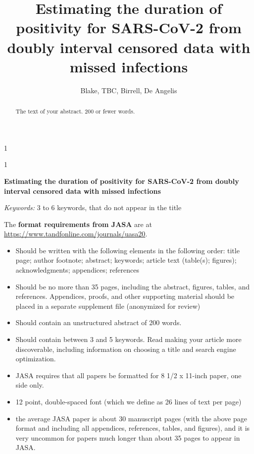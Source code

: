 \documentclass[12pt]{article}
\newcommand{\blind}{1}
\newcommand{\fulltitle}{Estimating the duration of positivity for SARS-CoV-2 from doubly interval censored data with missed infections}
\begin{document}
%

\def\spacingset#1{\renewcommand{\baselinestretch}%
{#1}\small\normalsize} \spacingset{1}



\blind
{
  \title{\bf \fulltitle}
  \author{%
    Blake, TBC, Birrell, De Angelis  
  }
  \maketitle
} \fi

\blind
{
  \bigskip
  \bigskip
  \bigskip
  \begin{center}
    {\LARGE\bf \fulltitle}
\end{center}
  \medskip
} \fi

\bigskip
\begin{abstract}
The text of your abstract. 200 or fewer words.
\end{abstract}

\noindent%
{\it Keywords:}  3 to 6 keywords, that do not appear in the title
\vfill

\newpage


The \textbf{format requirements from JASA} are at \url{https://www.tandfonline.com/journals/uasa20}.
\begin{itemize}
    \item Should be written with the following elements in the following order: title page; author footnote; abstract; keywords; article text (table(s); figures); acknowledgments; appendices; references
    \item Should be no more than 35 pages, including the abstract, figures, tables, and references. Appendices, proofs, and other supporting material should be placed in a separate supplement file (anonymized for review)
    \item Should contain an unstructured abstract of 200 words.
    \item Should contain between 3 and 5 keywords. Read making your article more discoverable, including information on choosing a title and search engine optimization.
    \item JASA requires that all papers be formatted for 8 1/2 x 11-inch paper, one side only.
    \item 12 point, double-spaced font (which we define as 26 lines of text per page)
    \item the average JASA paper is about 30 manuscript pages (with the above page format and including all appendices, references, tables, and figures), and it is very uncommon for papers much longer than about 35 pages to appear in JASA. 
\end{itemize}
\end{document}
